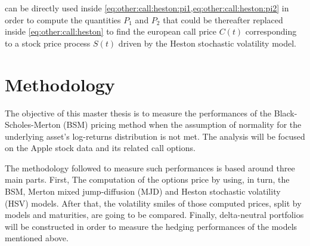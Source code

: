 \documentclass[a4paper, 12pt]{report}
\begin{document}
 can be directly used inside \cref{eq:other:call:heston:pi1,eq:other:call:heston:pi2} in order to compute the quantities $P_1$ and $P_2$ that could be thereafter replaced inside \cref{eq:other:call:heston} to find the european call price  $C(t)$ corresponding to a stock price process $S(t)$ driven by the Heston stochastic volatility model.

























%
%
\chapter{Methodology}
\label{cha:Methodology}

% 

The objective of this master thesis is to measure the performances of the Black-Scholes-Merton (BSM) pricing method when the assumption of normality for the underlying asset's log-returns distribution is not met.
The analysis will be focused on the Apple stock data and its related call options.

The methodology followed to measure such performances is based around three main parts. 
First, The computation of the options price by using, in turn, the BSM, Merton mixed jump-diffusion (MJD) and Heston stochastic volatility (HSV) models. 
After that, the volatility smiles of those computed prices, split by models and maturities, are going to be compared.
Finally, delta-neutral portfolios will be constructed in order to measure the hedging performances of the models mentioned above.
\end{document}
